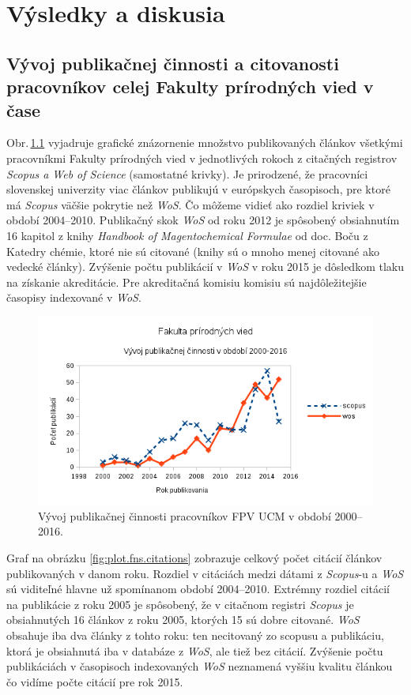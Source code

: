 \chapter{Výsledky a diskusia}

\section{Vývoj publikačnej činnosti a citovanosti pracovníkov celej Fakulty
  prírodných vied v čase}

Obr.\,\ref{fig:plot.fns.publications} vyjadruje grafické znázornenie množstvo
publikovaných článkov všetkými pracovníkmi Fakulty prírodných vied v
jednotlivých rokoch z citačných registrov \emph{Scopus a Web of Science}
(samostatné krivky). Je prirodzené, že pracovníci slovenskej univerzity viac
článkov publikujú v európskych časopisoch, pre ktoré má \emph{Scopus} väčšie
pokrytie než \emph{WoS}. Čo môžeme vidieť ako rozdiel kriviek v období
2004--2010. Publikačný skok \emph{WoS} od roku 2012 je spôsobený obsiahnutím 16
kapitol z knihy \emph{Handbook of Magentochemical Formulae} od doc. Boču z
Katedry chémie, ktoré nie sú citované (knihy sú o mnoho menej citované ako
vedecké články). Zvýšenie počtu publikácií v \emph{WoS} v roku 2015 je dôsledkom
tlaku na získanie akreditácie. Pre akreditačná komisiu komisiu sú
najdôležitejšie časopisy indexované v \emph{WoS}.

\begin{figure}
  \centering
  \includegraphics[width=\textwidth]{obr/plot-fns-publications.png}
  \caption{Vývoj publikačnej činnosti pracovníkov FPV UCM v období 2000--2016.}
  \label{fig:plot.fns.publications}
\end{figure}

Graf na obrázku \ref{fig:plot.fns.citations} zobrazuje celkový počet citácií
článkov publikovaných v danom roku. Rozdiel v citáciách medzi dátami z
\emph{Scopus}-u a \emph{WoS} sú viditeľné hlavne už spomínanom období
2004--2010.  Extrémny rozdiel citácií na publikácie z roku 2005 je spôsobený, že
v citačnom registri \emph{Scopus} je obsiahnutých 16 článkov z roku 2005,
ktorých 15 sú dobre citované.  \emph{WoS} obsahuje iba dva články z tohto roku:
ten necitovaný zo scopusu a publikáciu, ktorá je obsiahnutá iba v databáze z
\emph{WoS}, ale tiež bez citácií.  Zvýšenie počtu publikáciách v časopisoch
indexovaných \emph{WoS} neznamená vyššiu kvalitu článkou čo vidíme počte citácií
pre rok 2015.

